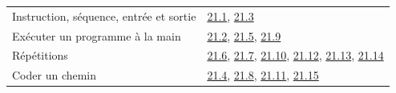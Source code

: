 \begin{tabularx}{\linewidth}{@{}Yl@{}}\toprule
Instruction, séquence, entrée et sortie & \hyperref[exo-21-1]{21.1}, \hyperref[exo-21-3]{21.3}\\[2mm]
Exécuter un programme à la main & \hyperref[exo-21-2]{21.2}, \hyperref[exo-21-5]{21.5}, \hyperref[exo-21-9]{21.9}\\[2mm]
Répétitions & \hyperref[exo-21-6]{21.6}, \hyperref[exo-21-7]{21.7}, \hyperref[exo-21-10]{21.10}, \hyperref[exo-21-12]{21.12}, \hyperref[exo-21-13]{21.13}, \hyperref[exo-21-14]{21.14}\\[2mm]
Coder un chemin & \hyperref[exo-21-4]{21.4}, \hyperref[exo-21-8]{21.8}, \hyperref[exo-21-11]{21.11}, \hyperref[exo-21-15]{21.15}\\[2mm]
\bottomrule\end{tabularx}\par\vspace{4mm}
\clearpage
